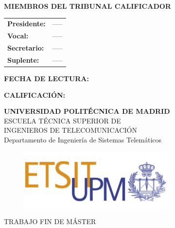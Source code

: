 {\large{\bf MIEMBROS DEL TRIBUNAL CALIFICADOR}} \vspace{0.5cm}

\begin{rm}
    \begin{tabular}{p{3cm}p{10cm}}
        \textbf{Presidente:} & -----\\
        \textbf{Vocal:} & -----\\
        \textbf{Secretario:} & -----\\
        \textbf{Suplente:} & -----
    \end{tabular}
\end{rm}
\vspace{1cm}

{\large{\bf FECHA DE LECTURA:}}
\vspace{1cm}

{\large{\bf CALIFICACIÓN:}}
\pagestyle{empty}
\cleardoublepage
\begin{center}
	
	{\LARGE\rm\textbf{UNIVERSIDAD POLITÉCNICA DE MADRID}\\
	    \vspace{1cm}
	    ESCUELA TÉCNICA SUPERIOR DE\\ INGENIEROS DE TELECOMUNICACIÓN
	}   \\

	{\Large\rm Departamento de Ingeniería de Sistemas Telemáticos\\
	}  

    \begin{figure}[!htbp]
	    \centering
        \includegraphics[width=0.7\textwidth]{img/logo_etsit.jpg}
    \end{figure}
    
	\vspace{1cm}
    {\Large\rm TRABAJO FIN DE MÁSTER\\
	    \vspace{1.5cm}
        \MakeUppercase{ \textbf{\tfmtitle} } \\ 
	} 
	\vspace{1cm}
    \Large\rm\textbf{\authorname}\\ 
    \fecha

\end{center}  

\cleardoublepage
